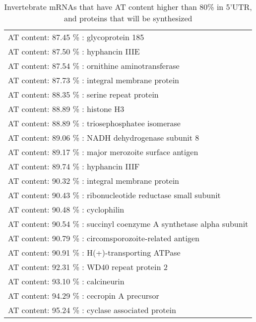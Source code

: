 \begin{table}
\begin{tiny}
\begin{center}
\begin{tabular}{|l|}
\\ AT content: 87.45 \% : glycoprotein 185
\\ AT content: 87.50 \% : hyphancin IIIE
\\ AT content: 87.54 \% : ornithine aminotransferase
\\ AT content: 87.73 \% : integral membrane protein
\\ AT content: 88.35 \% : serine repeat protein
\\ AT content: 88.89 \% : histone H3
\\ AT content: 88.89 \% : triosephosphatee isomerase
\\ AT content: 89.06 \% : NADH dehydrogenase subunit 8
\\ AT content: 89.17 \% : major merozoite surface antigen
\\ AT content: 89.74 \% : hyphancin IIIF
\\ AT content: 90.32 \% : integral membrane protein
\\ AT content: 90.43 \% : ribonucleotide reductase small subunit
\\ AT content: 90.48 \% : cyclophilin
\\ AT content: 90.54 \% : succinyl coenzyme A synthetase alpha subunit
\\ AT content: 90.79 \% : circomsporozoite-related antigen
\\ AT content: 90.91 \% : H(+)-transporting ATPase
\\ AT content: 92.31 \% : WD40 repeat protein 2
\\ AT content: 93.10 \% : calcineurin
\\ AT content: 94.29 \% : cecropin A precursor
\\ AT content: 95.24 \% : cyclase associated protein
\\
\hline
\end{tabular}
\end{center}
\end{tiny}
\caption{Invertebrate mRNAs that have AT content higher than 80\% in
5'UTR, and proteins that will be synthesized}
\label{at_80}
\end{table}
